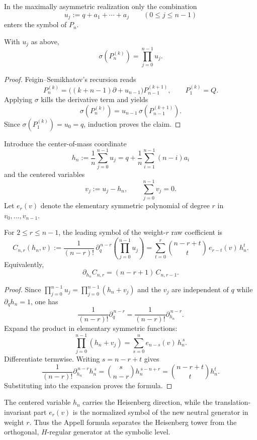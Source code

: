 In the maximally asymmetric realization only the combination
\[
u_j:=q+a_1+\cdots+a_j
\qquad (0\leq j\leq n-1)
\]
enters the symbol of $P_n$.

\begin{theorem}
\label{thm:miura-product-formula}
With $u_j$ as above,
\[
\sigma\!\left(P_n^{(k)}\right)=\prod_{j=0}^{n-1}u_j.
\]
\end{theorem}

\begin{proof}
Feigin--Semikhatov's recursion reads
\[
P_n^{(k)}=\bigl((k+n-1)\partial + u_{n-1}\bigr)P_{n-1}^{(k+1)},
\qquad
P_1^{(k)}=Q.
\]
Applying $\sigma$ kills the derivative term and yields
\[
\sigma(P_n^{(k)})=u_{n-1}\,\sigma(P_{n-1}^{(k+1)}).
\]
Since $\sigma(P_1^{(k)})=u_0=q$, induction proves the claim.
\end{proof}

Introduce the center-of-mass coordinate
\[
h_n:=\frac{1}{n}\sum_{j=0}^{n-1}u_j
=
q+\frac{1}{n}\sum_{i=1}^{n-1}(n-i)a_i
\]
and the centered variables
\[
v_j:=u_j-h_n,
\qquad
\sum_{j=0}^{n-1}v_j=0.
\]
Let $e_r(v)$ denote the elementary symmetric polynomial of degree $r$ in
$v_0,\dots,v_{n-1}$.

\begin{theorem}
\label{thm:subregular-appell-formula}
For $2\leq r\leq n-1$, the leading symbol of the weight-$r$ raw coefficient is
\[
C_{n,r}(h_n,v)
:=
\frac{1}{(n-r)!}\,\partial_q^{\,n-r}\!\left(\prod_{j=0}^{n-1}u_j\right)
=
\sum_{t=0}^{r}\binom{n-r+t}{t}\,e_{r-t}(v)\,h_n^t.
\]
Equivalently,
\[
\partial_{h_n}C_{n,r}=(n-r+1)\,C_{n,r-1}.
\]
\end{theorem}

\begin{proof}
Since $\prod_{j=0}^{n-1}u_j=\prod_{j=0}^{n-1}(h_n+v_j)$ and the $v_j$ are
independent of $q$ while $\partial_q h_n=1$, one has
\[
\frac{1}{(n-r)!}\partial_q^{\,n-r}
=
\frac{1}{(n-r)!}\partial_{h_n}^{\,n-r}.
\]
Expand the product in elementary symmetric functions:
\[
\prod_{j=0}^{n-1}(h_n+v_j)=\sum_{s=0}^{n}e_{n-s}(v)\,h_n^{\,s}.
\]
Differentiate termwise.  Writing $s=n-r+t$ gives
\[
\frac{1}{(n-r)!}\partial_{h_n}^{\,n-r}h_n^{\,s}
=
\binom{s}{n-r}h_n^{\,s-n+r}
=
\binom{n-r+t}{t}h_n^t.
\]
Substituting into the expansion proves the formula.
\end{proof}

\begin{remark}
The centered variable $h_n$ carries the Heisenberg direction, while the
translation-invariant part $e_r(v)$ is the normalized symbol of the new neutral
generator in weight $r$.  Thus the Appell formula separates the Heisenberg
tower from the orthogonal, $H$-regular generator at the symbolic level.
\end{remark}

